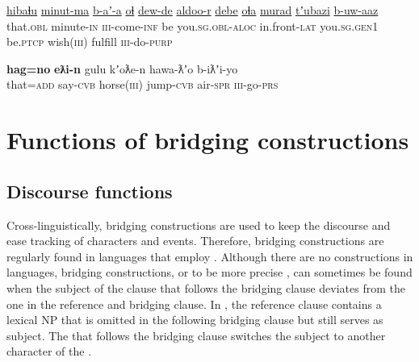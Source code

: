\documentclass[output=paper]{LSP/langsci}
\begin{document}
\begin{exe}
	\ex	\label{ex:19ab} 
	\begin{xlist}
		\ex	\label{ex:19a}
		\gll	\underline{hibaɬu} \underline{minut-ma}    \underline{b-aʼ-a}   \underline{oɬ} \underline{dew-de}       \underline{aldoo-r}    \underline{debe}        \underline{oɬa}   \underline{murad} \underline{tʼubazi}         \underline{b-uw-aaz}\\
			that.\textsc{obl} minute-\textsc{in} \textsc{iii}-come-\textsc{inf} be   you.\textsc{sg.obl-aloc} in.front-\textsc{lat}  you.\textsc{sg.gen1} be.\textsc{ptcp} wish(\textsc{iii}) fulfill  \textsc{iii}-do-\textsc{purp}\\
		\glt	{}

		\ex	\label{ex:19b}
		\gll	 \textbf{hag=no}   \textbf{eƛi-n}   gulu  kʼoƛe-n   hawa-ƛʼo b-iƛʼi-yo \\
			that=\textsc{add} say-\textsc{cvb} horse(\textsc{iii}) jump-\textsc{cvb} air-\textsc{spr} \textsc{iii}-go-\textsc{prs}\\
		\glt	{} 
	\end{xlist}
\end{exe}

\section{Functions of bridging constructions}
\label{sec:Discourse functions of bridging constructions}
\subsection{Discourse functions}
\label{ssec:Discourse functions}
Cross-linguistically, bridging constructions are used to keep the discourse  and ease tracking of characters and events. Therefore, bridging constructions are regularly found in languages that employ . Although there are no  constructions in  languages, bridging constructions, or to be more precise , can sometimes be found when the subject of the clause that follows the bridging clause deviates from the one in the reference and bridging clause. In , the reference clause contains a lexical NP that is omitted in the following bridging clause but still serves as subject. The  that follows the bridging clause switches the subject to another character of the . 
\end{document}
